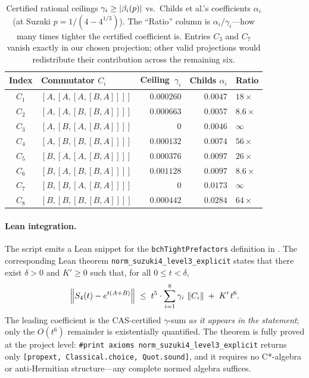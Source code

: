 \begin{table}[ht]
\centering
\begin{tabular}{@{}clrrl@{}}
\toprule
\textbf{Index} & \textbf{Commutator $C_i$} & \textbf{Ceiling~$\gamma_i$} & \textbf{Childs $\alpha_i$} & \textbf{Ratio} \\
\midrule
$C_1$ & $[A,[A,[A,[B,A]]]]$ & $0.000260$ & $0.0047$ & $18\times$ \\
$C_2$ & $[A,[A,[B,[B,A]]]]$ & $0.000663$ & $0.0057$ & $8.6\times$ \\
$C_3$ & $[A,[B,[A,[B,A]]]]$ & $0$        & $0.0046$ & $\infty$ \\
$C_4$ & $[A,[B,[B,[B,A]]]]$ & $0.000132$ & $0.0074$ & $56\times$ \\
$C_5$ & $[B,[A,[A,[B,A]]]]$ & $0.000376$ & $0.0097$ & $26\times$ \\
$C_6$ & $[B,[A,[B,[B,A]]]]$ & $0.001128$ & $0.0097$ & $8.6\times$ \\
$C_7$ & $[B,[B,[A,[B,A]]]]$ & $0$        & $0.0173$ & $\infty$ \\
$C_8$ & $[B,[B,[B,[B,A]]]]$ & $0.000442$ & $0.0284$ & $64\times$ \\
\bottomrule
\end{tabular}
\caption{Certified rational ceilings $\gamma_i \ge \left|\beta_i(p)\right|$ vs.\ Childs et al.'s
coefficients $\alpha_i$ (at Suzuki $p = 1/(4-4^{1/3})$). The ``Ratio''
column is $\alpha_i/\gamma_i$---how many times tighter the certified
coefficient is. Entries $C_3$ and $C_7$ vanish exactly in our chosen
projection; other valid projections would redistribute their contribution
across the remaining six.}
\label{tab:bch-vs-childs}
\end{table}

\paragraph{Lean integration.}
The script emits a Lean snippet for the
\texttt{bchTightPrefactors} definition in
. The corresponding Lean theorem
\texttt{norm\_suzuki4\_level3\_explicit} states that there exist
$\delta > 0$ and $K' \ge 0$ such that, for all $0 \le t < \delta$,
\begin{equation}\label{eq:level3-sharp}
  \left\|S_4(t) - e^{t(A+B)}\right\|
    \;\le\; t^5 \cdot \sum_{i=1}^{8} \gamma_i\, \left\|C_i\right\|
    \;+\; K' \, t^6 .
\end{equation}
The leading coefficient is the CAS-certified $\gamma$-sum \emph{as it appears in
the statement}; only the $O(t^6)$ remainder is existentially quantified. The
theorem is fully proved at the project level: \texttt{\#print axioms
norm\_suzuki4\_level3\_explicit} returns only \texttt{[propext,
Classical.choice, Quot.sound]}, and it requires no C*-algebra or anti-Hermitian
structure---any complete normed algebra suffices.

